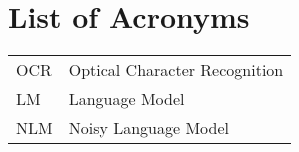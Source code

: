 {}
\chapter*{List of Acronyms}

\begin{supertabular}{lp{12.5cm}}
OCR & Optical Character Recognition\\
LM & Language Model\\
NLM & Noisy Language Model\\
\end{supertabular}

\newpage